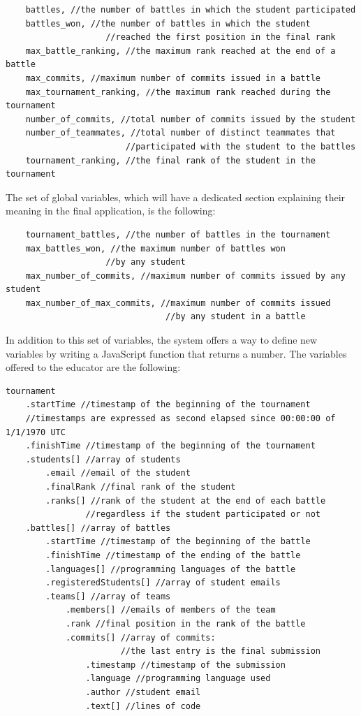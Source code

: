 \begin{verbatim}
    battles, //the number of battles in which the student participated
    battles_won, //the number of battles in which the student
                    //reached the first position in the final rank
    max_battle_ranking, //the maximum rank reached at the end of a battle
    max_commits, //maximum number of commits issued in a battle
    max_tournament_ranking, //the maximum rank reached during the tournament
    number_of_commits, //total number of commits issued by the student
    number_of_teammates, //total number of distinct teammates that
                        //participated with the student to the battles
    tournament_ranking, //the final rank of the student in the tournament
\end{verbatim}

The set of global variables, which will have a dedicated section explaining their meaning in the final application, is the following:

\begin{verbatim}
    tournament_battles, //the number of battles in the tournament
    max_battles_won, //the maximum number of battles won
                    //by any student
    max_number_of_commits, //maximum number of commits issued by any student
    max_number_of_max_commits, //maximum number of commits issued
                                //by any student in a battle
\end{verbatim}

In addition to this set of variables, the system offers a way to define new variables by writing a JavaScript function that returns a number. The variables offered to the educator are the following:
\begin{verbatim}
tournament
    .startTime //timestamp of the beginning of the tournament
    //timestamps are expressed as second elapsed since 00:00:00 of 1/1/1970 UTC
    .finishTime //timestamp of the beginning of the tournament
    .students[] //array of students
        .email //email of the student
        .finalRank //final rank of the student
        .ranks[] //rank of the student at the end of each battle
                //regardless if the student participated or not
    .battles[] //array of battles
        .startTime //timestamp of the beginning of the battle
        .finishTime //timestamp of the ending of the battle
        .languages[] //programming languages of the battle
        .registeredStudents[] //array of student emails
        .teams[] //array of teams
            .members[] //emails of members of the team
            .rank //final position in the rank of the battle
            .commits[] //array of commits:
                       //the last entry is the final submission
                .timestamp //timestamp of the submission
                .language //programming language used
                .author //student email
                .text[] //lines of code
\end{verbatim}


